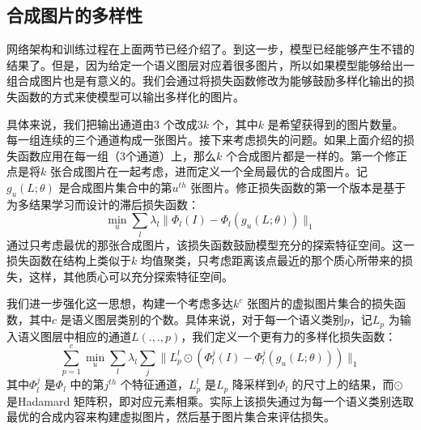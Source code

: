 \documentclass{ctexart}
\begin{document}
        \subsection{合成图片的多样性}
            网络架构和训练过程在上面两节已经介绍了。到这一步，模型已经能够产生不错的结果了。但是，因为给定一个语义图层对应着很多图片，所以如果模型能够给出一组合成图片也是有意义的。我们会通过将损失函数修改为能够鼓励多样化输出的损失函数的方式来使模型可以输出多样化的图片。

            具体来说，我们把输出通道由3 个改成$3k$ 个，其中$k$ 是希望获得到的图片数量。每一组连续的三个通道构成一张图片。接下来考虑损失的问题。如果上面介绍的损失函数应用在每一组（3个通道）上，那么$k$ 个合成图片都是一样的。第一个修正点是将$k$ 张合成图片在一起考虑，进而定义一个全局最优的合成图片。记$g_u(L;\theta)$ 是合成图片集合中的第$u^{th}$ 张图片。修正损失函数的第一个版本是基于为多结果学习而设计的滞后损失函数：
            \begin{equation}
                \min\limits_u \sum_l \lambda_l\|\Phi_l(I) - \Phi_l(g_u(L;\theta))\|_1
            \end{equation}
            通过只考虑最优的那张合成图片，该损失函数鼓励模型充分的探索特征空间。这一损失函数在结构上类似于$k$ 均值聚类，只考虑距离该点最近的那个质心所带来的损失，这样，其他质心可以充分探索特征空间。

            我们进一步强化这一思想，构建一个考虑多达$k^c$ 张图片的虚拟图片集合的损失函数，其中$c$ 是语义图层类别的个数。具体来说，对于每一个语义类别$p$，记$L_p$ 为输入语义图层中相应的通道$L(.,. ,p)$，我们定义一个更有力的多样化损失函数：
            \begin{equation}
                \sum_{p=1}^c \min\limits_u \sum_l \lambda_l \sum_j \|L_p^l \odot (\Phi_l^j(I) - \Phi_l^j(g_u(L;\theta)))\|_1
            \end{equation}
            其中$\Phi_l^j$ 是$\Phi_l$ 中的第$j^{th}$ 个特征通道，$L_p^l$ 是$L_p$ 降采样到$\Phi_l$ 的尺寸上的结果，而$\odot$ 是Hadamard 矩阵积，即对应元素相乘。实际上该损失通过为每一个语义类别选取最优的合成内容来构建虚拟图片，然后基于图片集合来评估损失。
\end{document}
